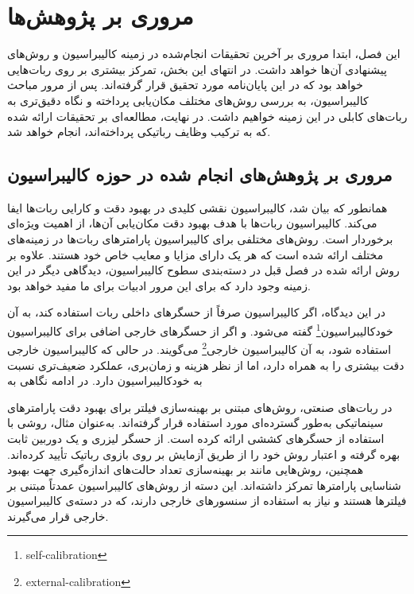 \chapter{مروری بر پژوهش‌ها}
این فصل، ابتدا مروری بر آخرین تحقیقات انجام‌شده در زمینه کالیبراسیون و روش‌های پیشنهادی آن‌ها خواهد داشت. در انتهای این بخش، تمرکز بیشتری بر روی ربات‌هایی خواهد بود که در این پایان‌نامه مورد تحقیق قرار گرفته‌اند. پس از مرور مباحث کالیبراسیون، به بررسی روش‌های مختلف مکان‌یابی پرداخته و نگاه دقیق‌تری به ربات‌های کابلی در این زمینه خواهیم داشت. در نهایت، مطالعه‌ای بر تحقیقات ارائه شده که به ترکیب وظایف رباتیکی پرداخته‌اند، انجام خواهد شد.

\section{مروری بر پژوهش‌های انجام شده در حوزه کالیبراسیون} 



همانطور که بیان شد، کالیبراسیون نقشی کلیدی در بهبود دقت و کارایی ربات‌ها ایفا می‌کند. کالیبراسیون ربات‌ها با هدف بهبود دقت مکان‌یابی آن‌ها، از اهمیت ویژه‌ای برخوردار است. روش‌های مختلفی برای کالیبراسیون پارامترهای ربات‌ها در زمینه‌های مختلف ارائه شده است که هر یک دارای مزایا و معایب خاص خود هستند. علاوه بر روش ارائه شده در فصل قبل در دسته‌بندی سطوح کالیبراسیون، دیدگاهی دیگر در این زمینه وجود دارد که برای این مرور ادبیات برای ما مفید خواهد بود.

در این دیدگاه، اگر کالیبراسیون صرفاً از حسگرهای داخلی ربات استفاده کند، به آن خودکالیبراسیون\footnote{self-calibration} گفته می‌شود. و اگر از حسگر‌های خارجی اضافی برای کالیبراسیون استفاده شود، به آن کالیبراسیون خارجی\footnote{external-calibration} می‌گویند. در حالی که کالیبراسیون خارجی دقت بیشتری را به همراه دارد، اما از نظر هزینه و زمان‌بری، عملکرد ضعیف‌تری نسبت به خودکالیبراسیون دارد. در ادامه نگاهی به 


در ربات‌های صنعتی، روش‌های مبتنی بر بهینه‌سازی فیلتر برای بهبود دقت پارامترهای سینماتیکی به‌طور گسترده‌ای مورد استفاده قرار گرفته‌اند. به‌عنوان مثال، \cite{gan2019calibration} روشی با استفاده از حسگرهای کششی ارائه کرده است. \cite{park2011laser} از حسگر لیزری و یک دوربین ثابت بهره گرفته و اعتبار روش خود را از طریق آزمایش بر روی بازوی رباتیک تأیید کرده‌اند. همچنین، روش‌هایی مانند \cite{li2011optimal} بر بهینه‌سازی تعداد حالت‌های اندازه‌گیری جهت بهبود شناسایی پارامترها تمرکز داشته‌اند. این دسته از روش‌های کالیبراسیون عمدتاً مبتنی بر فیلترها هستند و نیاز به استفاده از سنسورهای خارجی دارند، که در دسته‌ی کالیبراسیون خارجی قرار می‌گیرند.

